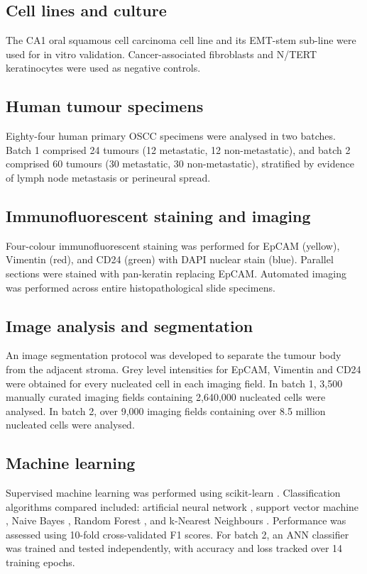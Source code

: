 \documentclass[11pt]{article}
\begin{document}
\subsection{Cell lines and culture}

The CA1 oral squamous cell carcinoma cell line and its EMT-stem sub-line were used for in vitro validation. Cancer-associated fibroblasts and N/TERT keratinocytes \citep{smits2017} were used as negative controls.

\subsection{Human tumour specimens}

Eighty-four human primary OSCC specimens were analysed in two batches. Batch 1 comprised 24 tumours (12 metastatic, 12 non-metastatic), and batch 2 comprised 60 tumours (30 metastatic, 30 non-metastatic), stratified by evidence of lymph node metastasis or perineural spread.

\subsection{Immunofluorescent staining and imaging}

Four-colour immunofluorescent staining was performed for EpCAM (yellow), Vimentin (red), and CD24 (green) with DAPI nuclear stain (blue). Parallel sections were stained with pan-keratin replacing EpCAM. Automated imaging was performed across entire histopathological slide specimens.

\subsection{Image analysis and segmentation}

An image segmentation protocol was developed to separate the tumour body from the adjacent stroma. Grey level intensities for EpCAM, Vimentin and CD24 were obtained for every nucleated cell in each imaging field. In batch 1, 3,500 manually curated imaging fields containing 2,640,000 nucleated cells were analysed. In batch 2, over 9,000 imaging fields containing over 8.5 million nucleated cells were analysed.

\subsection{Machine learning}

Supervised machine learning was performed using scikit-learn \citep{pedregosa2011}. Classification algorithms compared included: artificial neural network \citep{rumelhart1986}, support vector machine \citep{smola2004}, Naive Bayes \citep{zhang2005}, Random Forest \citep{dumont2009}, and k-Nearest Neighbours \citep{bentley1975}. Performance was assessed using 10-fold cross-validated F1 scores. For batch 2, an ANN classifier was trained and tested independently, with accuracy and loss tracked over 14 training epochs.
\end{document}
